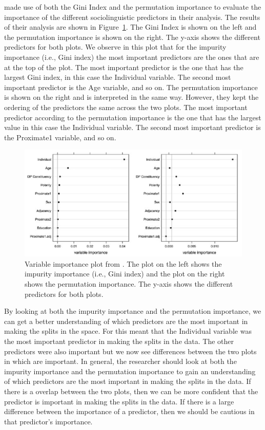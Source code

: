 \citet{tagliamonteModelsForestsTrees2012} made use of both the Gini Index and the permutation importance to evaluate the importance of the different sociolinguistic predictors in their analysis. The results of their analysis are shown in Figure~\ref{fig:tagliamonte_importance}. The Gini Index is shown on the left and the permutation importance is shown on the right. The y-axis shows the different predictors for both plots. We observe in this plot that for the impurity importance (i.e., Gini index) the most important predictors are the ones that are at the top of the plot. The most important predictor is the one that has the largest Gini index, in this case the Individual variable. The second most important predictor is the Age variable, and so on. The permutation importance is shown on the right and is interpreted in the same way. However, they kept the ordering of the predictors the same across the two plots. The most important predictor according to the permutation importance is the one that has the largest value in this case the Individual variable. The second most important predictor is the Proximate1 variable, and so on.

\begin{figure}[!ht]
    \centering
    \includegraphics[width = 0.9\linewidth]{images/TagliamonteBaayen_vip.png}
    \caption{Variable importance plot from \citet{tagliamonteModelsForestsTrees2012}. The plot on the left shows the impurity importance (i.e., Gini index) and the plot on the right shows the permutation importance. The y-axis shows the different predictors for both plots.}
    \label{fig:tagliamonte_importance}
\end{figure}

By looking at both the impurity importance and the permutation importance, we can get a better understanding of which predictors are the most important in making the splits in the space. For \citet{tagliamonteModelsForestsTrees2012} this meant that the Individual variable was the most important predictor in making the splits in the data. The other predictors were also important but we now see differences between the two plots in which are important. In general, the researcher should look at both the impurity importance and the permutation importance to gain an understanding of which predictors are the most important in making the splits in the data. If there is a overlap between the two plots, then we can be more confident that the predictor is important in making the splits in the data. If there is a large difference between the importance of a predictor, then we should be cautious in that predictor's importance. 

